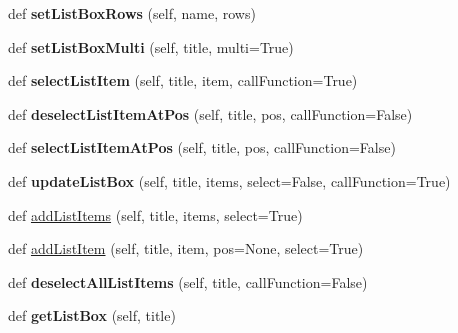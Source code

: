 \begin{DoxyCompactItemize}
def {\bfseries set\+List\+Box\+Rows} (self, name, rows)
\item 
\mbox{\label{class_python_01_g_u_i_1_1appjar_1_1gui_a33135a600f5a1910cc8538bebf418f2b}} 
def {\bfseries set\+List\+Box\+Multi} (self, title, multi=True)
\item 
\mbox{\label{class_python_01_g_u_i_1_1appjar_1_1gui_a0ecd002bed3c9d676f4f5b2402bf8322}} 
def {\bfseries select\+List\+Item} (self, title, item, call\+Function=True)
\item 
\mbox{\label{class_python_01_g_u_i_1_1appjar_1_1gui_a21689efbafd60b96deb0b969ea066382}} 
def {\bfseries deselect\+List\+Item\+At\+Pos} (self, title, pos, call\+Function=False)
\item 
\mbox{\label{class_python_01_g_u_i_1_1appjar_1_1gui_a7f4db968c9b9ebc8a63ff9e47ca12559}} 
def {\bfseries select\+List\+Item\+At\+Pos} (self, title, pos, call\+Function=False)
\item 
\mbox{\label{class_python_01_g_u_i_1_1appjar_1_1gui_a72e17f66cb3ff3899a61996585c8cca8}} 
def {\bfseries update\+List\+Box} (self, title, items, select=False, call\+Function=True)
\item 
def \hyperlink{class_python_01_g_u_i_1_1appjar_1_1gui_a228d62f783bb8686809dfbe6e7280946}{add\+List\+Items} (self, title, items, select=True)
\item 
def \hyperlink{class_python_01_g_u_i_1_1appjar_1_1gui_a4aed1f8de7d6ecf1c0e90842e06f6db2}{add\+List\+Item} (self, title, item, pos=None, select=True)
\item 
\mbox{\label{class_python_01_g_u_i_1_1appjar_1_1gui_abd9b6216f04cc045f23a41afe51896c9}} 
def {\bfseries deselect\+All\+List\+Items} (self, title, call\+Function=False)
\item 
\mbox{\label{class_python_01_g_u_i_1_1appjar_1_1gui_ac86c31273c74f6104911b8cc2c801ef9}} 
def {\bfseries get\+List\+Box} (self, title)
\item 
\mbox{\label{class_python_01_g_u_i_1_1appjar_1_1gui_a8eb99dec7c0a77696805e262b3cee294}} 

\end{DoxyCompactItemize}
